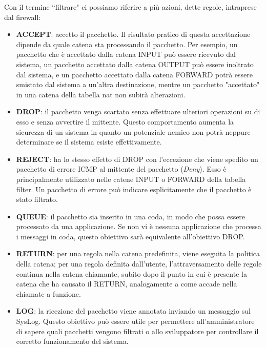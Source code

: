 Con il termine \textquotedblleft filtrare" ci possiamo riferire a più azioni, dette regole, intraprese dal firewall:
\begin{itemize}
\item \textbf{ACCEPT}: accetto il pacchetto. Il risultato pratico di questa accettazione dipende da quale catena sta processando il pacchetto. Per esempio, un pacchetto che è accettato dalla catena INPUT può essere ricevuto dal sistema, un pacchetto accettato dalla catena OUTPUT può essere inoltrato dal sistema, e un pacchetto accettato dalla catena FORWARD potrà essere smistato dal sistema a un'altra destinazione, mentre un pacchetto "accettato" in una catena della tabella nat non subirà alterazioni.
\item \textbf{DROP}: il pacchetto venga scartato senza effettuare ulteriori operazioni su di esso e senza avvertire il mittente.  Questo comportamento aumenta la sicurezza di un sistema in quanto un potenziale nemico non potrà neppure determinare se il sistema esiste effettivamente.
\item \textbf{REJECT}: ha lo stesso effetto di DROP con l'eccezione che viene spedito un pacchetto di errore ICMP al mittente del pacchetto (\textit{Deny}). Esso è principalmente utilizzato nelle catene INPUT o FORWARD della tabella filter. Un pacchetto di errore può indicare esplicitamente che il pacchetto è stato filtrato.
\item \textbf{QUEUE}:  il pacchetto sia inserito in una coda, in modo che possa essere processato da una applicazione. Se non vi è nessuna applicazione che processa i messaggi in coda, questo obiettivo sarà equivalente all'obiettivo DROP.
\item \textbf{RETURN}: per una regola nella catena predefinita, viene eseguita la politica della catena; per una regola definita dall'utente, l'attraversamento delle regole continua nella catena chiamante, subito dopo il punto in cui è presente la catena che ha causato il RETURN, analogamente a come accade nella chiamate a funzione.
\item \textbf{LOG}: la ricezione del pacchetto viene annotata inviando un messaggio sul SysLog. Questo obiettivo può essere utile per permettere all'amministratore di sapere quali pacchetti vengono filtrati o allo sviluppatore per controllare il corretto funzionamento del sistema.
\end{itemize}

